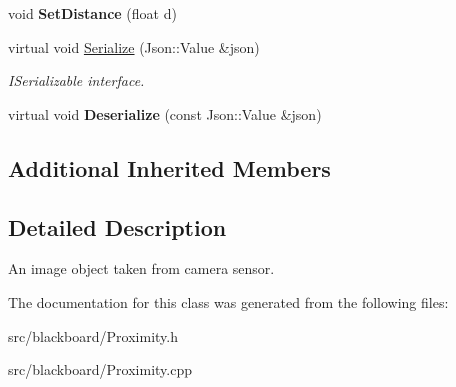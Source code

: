 \begin{DoxyCompactItemize}
void {\bfseries Set\+Distance} (float d)
\item 
\mbox{\label{class_proximity_aa522f275544e9f0cfb93b75aec68b3ce}} 
virtual void \hyperlink{class_proximity_aa522f275544e9f0cfb93b75aec68b3ce}{Serialize} (Json\+::\+Value \&json)
\begin{DoxyCompactList}\small\item\em I\+Serializable interface. \end{DoxyCompactList}\item 
\mbox{\label{class_proximity_a4716c31c9de6478b0d5b13d71ef4b074}} 
virtual void {\bfseries Deserialize} (const Json\+::\+Value \&json)
\end{DoxyCompactItemize}
\subsection*{Additional Inherited Members}


\subsection{Detailed Description}
An image object taken from camera sensor. 

The documentation for this class was generated from the following files\+:\begin{DoxyCompactItemize}
\item 
src/blackboard/Proximity.\+h\item 
src/blackboard/Proximity.\+cpp\end{DoxyCompactItemize}
